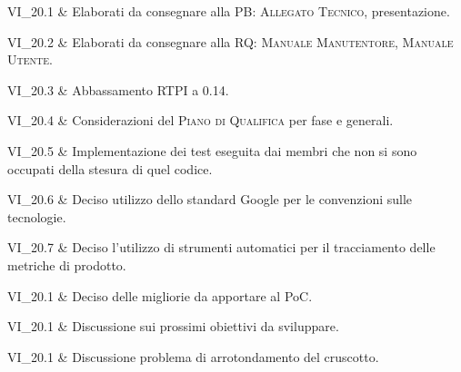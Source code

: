 VI\_20.1 & Elaborati da consegnare alla PB: \textsc{Allegato Tecnico}, presentazione.

\tabularnewline

VI\_20.2 & Elaborati da consegnare alla RQ: \textsc{Manuale Manutentore}, \textsc{Manuale Utente}.

\tabularnewline

VI\_20.3 & Abbassamento RTPI a 0.14.

\tabularnewline

VI\_20.4 & Considerazioni del \textsc{Piano di Qualifica} per fase e generali.

\tabularnewline

VI\_20.5 & Implementazione dei test eseguita dai membri che non si sono occupati della stesura di quel codice.

\tabularnewline

VI\_20.6 & Deciso utilizzo dello standard Google per le convenzioni sulle tecnologie.

\tabularnewline

VI\_20.7 & Deciso l'utilizzo di strumenti automatici per il tracciamento delle metriche di prodotto.

\tabularnewline

VI\_20.1 & Deciso delle migliorie da apportare al PoC.

\tabularnewline

VI\_20.1 & Discussione sui prossimi obiettivi da sviluppare.

\tabularnewline

VI\_20.1 & Discussione problema di arrotondamento del cruscotto.

\tabularnewline